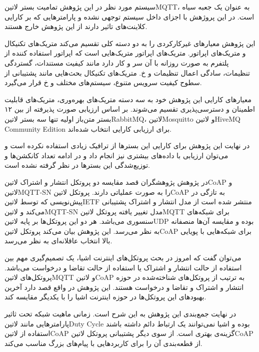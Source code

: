 سیستم مورد نظر در این پژوهش تمامیت بستر ‌لاتین{MQTT}، به عنوان یک جعبه سیاه است. در این پروژهش با اجزای داخل سیستم توجهی نشده و پارامترهایی که بر کارایی
کلاینت‌های تاثیر دارند از این پژوهش خارج هستند.

این پژوهش معیارهای غیرکارکردی را به دو دسته کلی تقسیم می‌کند متریک‌های تکنیکال و متریک‌های اپراتور. متریک‌های اپراتور متریک‌هایی است که اپراتور استفاده کننده از
پلتفرم به صورت روزانه با آن سر و کار دارد مانند کیفیت مستندات، گستردگی تنظیمات، سادگی اعمال تنظیمات و ‌خ. متریک‌های تکنیکال بحث‌هایی مانند پشتیبانی از سطوح
کیفیت سرویس متنوع، سیستم‌های مختلف و ‌خ قرار می‌گیرد.

معیارهای کارایی این پژوهش خود به سه دسته متریک‌های بهره‌وری، متریک‌های قابلیت اطمینان و دسترسی‌پذیری تقسیم می‌شوند.
بر اساس ارزیابی صورت پذیرفته از بین ۱۲ بستر متن‌باز اولیه تنها سه بستر ‌لاتین{RabbitMQ}، ‌لاتین{Mosquitto} و ‌لاتین{HiveMQ Community Edition}
برای ارزیابی کارایی انتخاب شده‌اند.

در نهایت این پژوهش برای کارایی این بسترها
از ترافیک زیادی استفاده نکرده است و می‌توان ارزیابی با داده‌های بیشتری نیز انجام داد و در ادامه تعداد کانکشن‌ها و توزیع‌شدگی این بسترها در نظر گرفته نشده است.


در پژوهش  پژوهشگران قصد مقایسه دو پروتکل انتشار و اشتراک ‌لاتین{CoAP} و ‌لاتین{MQTT-SN} را به صورت عملیاتی دارند.
پروتکل ‌لاتین{CoAP} به تازگی در پیش‌نویسی که توسط ‌لاتین{IETF} منتشر شده است از مدل انتشار و اشتراک پشتیبانی می‌کند و ‌لاتین{MQTT-SN}
مدل تغییر یافته پروتکل ‌لاتین{MQTT} برای شبکه‌های سنسوری می‌باشد. هر دو این پروتکل‌ها بر پایه ‌لاتین{UDP} بوده و مقایسه آن‌ها منصفانه به نظر می‌رسد.
این پژوهش بیان می‌کند پروتکل ‌لاتین{CoAP} برای شبکه‌هایی با پویایی بالا انتخاب عاقلانه‌ای به نظر می‌رسد.

می‌توان گفت که امروز در بحث پروتکل‌های اینترنت اشیا، یک تصمیم‌گیری مهم بین استفاده از حالت انتشار و اشتراک یا استفاده از حالت تقاضا و درخواست می‌باشد.
پروتکل‌های ‌لاتین{MQTT} و ‌لاتین{CoAP} به ترتیب از پروتکل‌های شناخته‌شده در حوزه انتشار و اشتراک و تقاضا و درخواست هستند.
این پژوهش در واقع قصد دارد آخرین بهبودهای این پروتکل‌ها در حوزه اینترنت اشیا را با یکدیگر مقایسه کند.

در نهایت جمع‌بندی این پژوهش به این شرح است. زمانی ماهیت شبکه تحت ثاثیر پارامترهایی مانند ‌لاتین{Duty Cycle} بوده
و اشیا نمی‌توانند یک ارتباط دائم داشته باشند استفاده از ‌لاتین{CoAP} گزینه‌ی بهتری است. از سوی دیگر پشتیبانی پروتکل
‌لاتین{CoAP} از قطعه‌بندی آن را برای کاربردهایی با پیام‌های بزرگ مناسب می‌کند.

